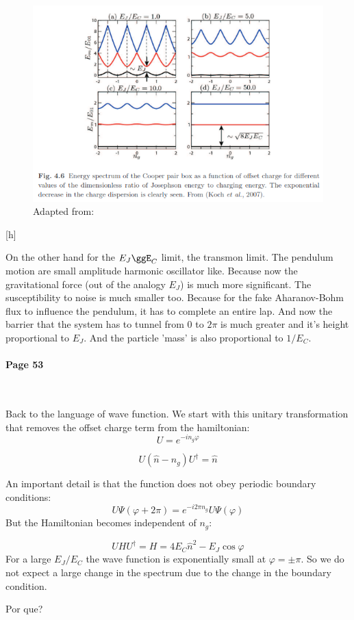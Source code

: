 \documentclass[12pt]{article}
\numberwithin{equation}{subsection}
\newcommand\ask[1]{
{\color{red}
#1
}
}
\newcommand\page[1]{
{
\color{blue}\paragraph{
Page #1
}\mbox{}\\
}
}
\begin{document}
\begin{figure}[h]
\includegraphics[scale=0.6]{images/51-cpb-spectrum.png}
\caption{Adapted from: \cite{Girvin2015CircuitQS}}
\label{51-cpb-spectrum}
\end{figure}[h]

On the other hand for the $E_J\ggE_C$ limit, the transmon limit. The pendulum motion are small amplitude harmonic oscillator like. Because now the gravitational force (out of the analogy $E_J$) is much more significant. The susceptibility to noise is much smaller too. Because for the fake Aharanov-Bohm flux to influence the pendulum, it has to complete an entire lap. And now the barrier that the system has to tunnel from $0$ to $2\pi$ is much greater and it's height proportional to $E_J$. And the particle 'mass' is also proportional to $1/E_C$.

\page{53}
Back to the language of wave function. We start with this unitary transformation that removes the offset charge term from the hamiltonian:
\begin{equation}
    U = e^{-i n_g\varphi}
\end{equation}

\begin{equation}
    U(\hat n - n_g)U^\dagger = \hat n
\end{equation}

An important detail is that the function does not obey periodic boundary conditions:
\begin{equation}
    U\Psi(\varphi + 2\pi) = e^{-i2\pi n_g} U\Psi(\varphi)
\end{equation}
But the Hamiltonian becomes independent of $n_g$:

\begin{equation}
UHU^\dagger = H = 4E_C\hat n ^2 - E_J \cos \varphi
\end{equation}
For a large $E_J/E_C$ the wave function is exponentially small at $\varphi = \pm \pi$. So we do not expect a large change in the spectrum due to the change in the boundary condition.
\ask{Por que?}
\end{document}
